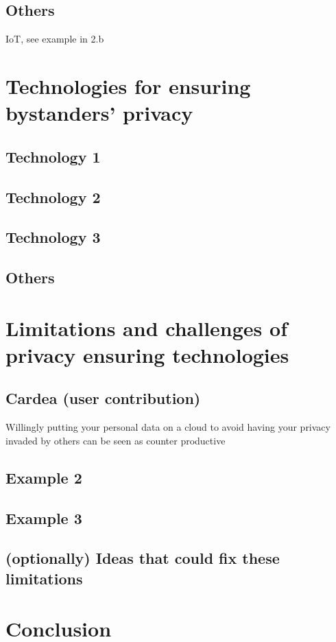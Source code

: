 \documentclass[conference]{IEEEtran}
\begin{document}
\subsection{Others}
IoT, see example in 2.b

\section{Technologies for ensuring bystanders’ privacy}

\subsection{Technology 1}

\subsection{Technology 2}

\subsection{Technology 3}

\subsection{Others}

\section{Limitations and challenges of privacy ensuring technologies}
\subsection{Cardea (user contribution)}
Willingly putting your personal data on a cloud to avoid having your privacy invaded by others can be seen as counter productive
\subsection{Example 2}
\subsection{Example 3}
\subsection{(optionally) Ideas that could fix these limitations}

\section{Conclusion}
\end{document}
